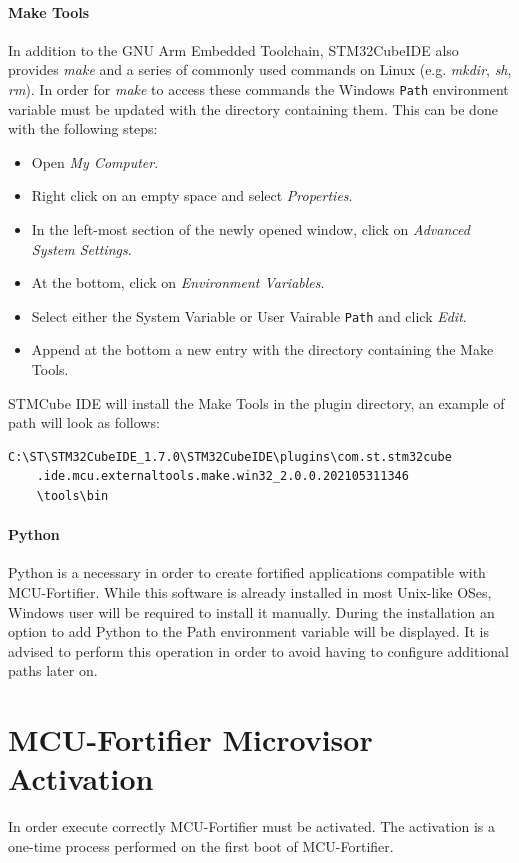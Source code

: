 \documentclass{article}
\begin{document}
\paragraph{Make Tools}
\label{ref:make_tools}
In addition to the GNU Arm Embedded Toolchain, STM32CubeIDE also provides \textit{make} and a series of commonly used commands on Linux (e.g. \textit{mkdir}, \textit{sh}, \textit{rm}). In order for \textit{make} to access these commands the Windows \verb|Path| environment variable must be updated with the directory containing them. This can be done with the following steps:
\begin{itemize}
    \item Open \textit{My Computer}.
    \item Right click on an empty space and select \textit{Properties}.
    \item In the left-most section of the newly opened window, click on \textit{Advanced System Settings}.
    \item At the bottom, click on \textit{Environment Variables}.
    \item Select either the System Variable or User Vairable \verb|Path| and click \textit{Edit}.
    \item Append at the bottom a new entry with the directory containing the Make Tools.
\end{itemize}

STMCube IDE will install the Make Tools in the plugin directory, an example of path will look as follows:
\begin{verbatim}
C:\ST\STM32CubeIDE_1.7.0\STM32CubeIDE\plugins\com.st.stm32cube
    .ide.mcu.externaltools.make.win32_2.0.0.202105311346
    \tools\bin
\end{verbatim}

\paragraph{Python} Python is a necessary in order to create fortified applications compatible with MCU-Fortifier. While this software is already installed in most Unix-like OSes, Windows user will be required to install it manually. During the installation an option to add Python to the Path environment variable will be displayed. It is advised to perform this operation in order to avoid having to configure additional paths later on.


\section{MCU-Fortifier Microvisor Activation}
\label{sec:microvisor_activation}
In order execute correctly MCU-Fortifier must be activated. The activation is a one-time process performed on the first boot of MCU-Fortifier.
\end{document}
